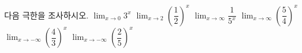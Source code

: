 다음 극한을 조사하시오.
 $\displaystyle\lim_{x\to 0}3^x$
 $\displaystyle\lim_{x\to 2}\left(\dfrac{1}{2}\right)^x$
 $\displaystyle\lim_{x\to\infty}\dfrac{1}{5^x}$
 $\displaystyle\lim_{x\to\infty}\left(\dfrac{5}{4}\right)^x$
 $\displaystyle\lim_{x\to -\infty}\left(\dfrac{4}{3}\right)^x$
 $\displaystyle\lim_{x\to -\infty}\left(\dfrac{2}{5}\right)^x$
